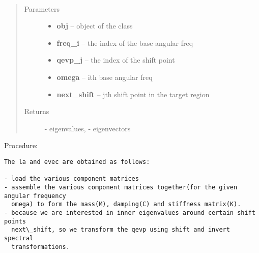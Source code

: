 \documentclass[letterpaper,10pt,english]{sphinxmanual}
\begin{document}
\begin{fulllineitems}
\label{index:brake.solve.qevp.Obtain_eigs}~\begin{quote}\begin{description}
\item[{Parameters}] \leavevmode\begin{itemize}
\item {} 
\textbf{obj} -- object of the class 

\item {} 
\textbf{freq\_i} -- the index of the base angular freq

\item {} 
\textbf{qevp\_j} -- the index of the shift point

\item {} 
\textbf{omega} -- ith base angular freq

\item {} 
\textbf{next\_shift} -- jth shift point in the target region

\end{itemize}

\item[{Returns}] \leavevmode
{} - eigenvalues,  - eigenvectors

\end{description}\end{quote}

Procedure:

\begin{Verbatim}[commandchars=\\\{\}]
The la and evec are obtained as follows:
  
- load the various component matrices
- assemble the various component matrices together(for the given angular frequency
  omega) to form the mass(M), damping(C) and stiffness matrix(K).
- because we are interested in inner eigenvalues around certain shift points
  next\_shift, so we transform the qevp using shift and invert spectral
  transformations.
\end{Verbatim}

\end{fulllineitems}

\end{document}
